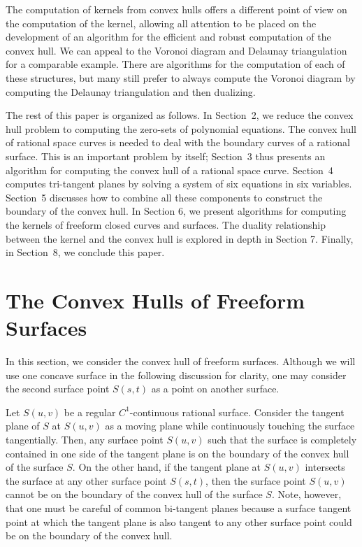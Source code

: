 \documentclass[doublespacing]{elsart}
\begin{document}
The computation of kernels from convex hulls offers a different point of
view on the computation of the kernel, allowing all attention
to be placed on the development of an algorithm
for the efficient and robust computation of the convex hull.
We can appeal to the Voronoi diagram and Delaunay triangulation
for a comparable example.  There are algorithms for the computation of
each of these structures, but many still prefer to always compute
the Voronoi diagram by computing the Delaunay triangulation and then dualizing.

The rest of this paper is organized as follows.
In Section~2, we reduce the convex hull problem to
computing the zero-sets of polynomial equations.
The convex hull of rational space curves is needed
to deal with the boundary curves of a rational surface.
This is an important problem by itself;
Section~3 thus presents an algorithm for computing
the convex hull of a rational space curve.
Section~4 computes tri-tangent planes by solving
a system of six equations in six variables.  
Section~5 discusses how to combine all these components
to construct the boundary of the convex hull.
In Section 6, we present algorithms for computing the kernels
of freeform closed curves and surfaces.
The duality relationship between the kernel and the convex hull
is explored in depth in Section 7.
Finally, in Section~8, we conclude this paper.

\section{The Convex Hulls of Freeform Surfaces}
\label{sec-ch-surface}

In this section, we consider the convex hull of freeform surfaces.
Although we will use one concave surface in the following discussion
for clarity,  one may consider the second surface point $S(s,t)$
as a point on another surface.

Let $S(u,v)$ be a regular $C^1$-continuous rational surface. 
Consider the tangent plane of $S$ at $S(u,v)$ as a moving plane
while continuously touching the surface tangentially.
Then, any surface point $S(u,v)$
such that the surface is completely contained in one side of
the tangent plane is on the boundary of the convex hull of
the surface $S$. On the other hand, if the tangent plane at $S(u,v)$ 
intersects the surface at any other surface point $S(s,t)$, then
the surface point $S(u,v)$ cannot be on the boundary of
the convex hull of the surface $S$.
Note, however, that one must be careful of common bi-tangent planes because 
a surface tangent point at which the tangent plane is also tangent to any 
other surface point could be on the boundary of the convex hull. 
\end{document}
